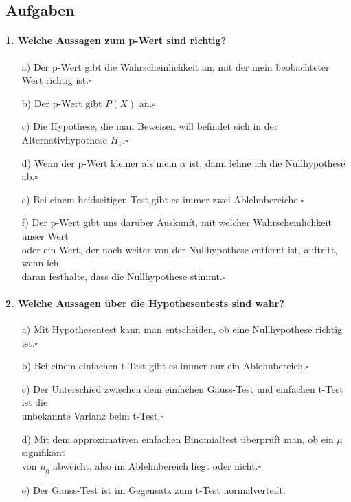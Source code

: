 \documentclass[a4paper]{article}
\begin{document}
\clearpage
\subsection{Aufgaben}
\paragraph{1. Welche Aussagen zum p-Wert sind richtig?}
\begin{itemize}
    \item[a)]Der p-Wert gibt die Wahrscheinlichkeit an, mit der mein beobachteter Wert richtig ist.\hfill $\square$
    \item[b)]Der p-Wert gibt $P(X)$ an.\hfill $\square$
    \item[c)]Die Hypothese, die man Beweisen will befindet sich in der Alternativhypothese $H_1$.\hfill $\square$
    \item[d)]Wenn der p-Wert kleiner als mein $\alpha$ ist, dann lehne ich die Nullhypothese ab.\hfill $\square$
    \item[e)]Bei einem beidseitigen Test gibt es immer zwei Ablehnbereiche.\hfill $\square$
    \item[f)]Der p-Wert gibt uns darüber Auskunft, mit welcher Wahrscheinlichkeit unser Wert \\oder ein Wert, der noch weiter von der Nullhypothese entfernt ist, auftritt, wenn ich\\ daran festhalte, dass die Nullhypothese stimmt.\hfill $\square$
\end{itemize}

\paragraph{2. Welche Aussagen über die Hypothesentests sind wahr?}
\begin{itemize}
    \item[a)]Mit Hypothesentest kann man entscheiden, ob eine Nullhypothese richtig ist.\hfill $\square$
    \item[b)]Bei einem einfachen t-Test gibt es immer nur ein Ablehnbereich.\hfill $\square$
    \item[c)]Der Unterschied zwischen dem einfachen Gauss-Test und einfachen t-Test ist die\\ unbekannte Varianz beim t-Test.\hfill $\square$
    \item[d)]Mit dem approximativen einfachen Binomialtest überprüft man, ob ein $\mu$ signifikant\\ von $\mu_0$ abweicht, also im Ablehnbereich liegt oder nicht.\hfill $\square$
    \item[e)]Der Gauss-Test ist im Gegensatz zum t-Test normalverteilt.
\end{itemize}
\end{document}
